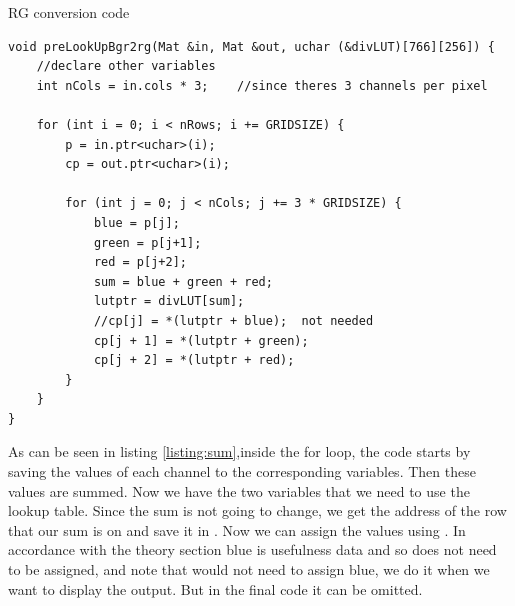 \begin{listing}[H]
	\caption{RG conversion code}
	\label{listing:sum}
	\begin{verbatim}
void preLookUpBgr2rg(Mat &in, Mat &out, uchar (&divLUT)[766][256]) {
	//declare other variables
	int nCols = in.cols * 3;	//since theres 3 channels per pixel
	
	for (int i = 0; i < nRows; i += GRIDSIZE) {
		p = in.ptr<uchar>(i);
		cp = out.ptr<uchar>(i);
		
		for (int j = 0; j < nCols; j += 3 * GRIDSIZE) {
			blue = p[j];
			green = p[j+1];
			red = p[j+2];
			sum = blue + green + red;
			lutptr = divLUT[sum];
			//cp[j] = *(lutptr + blue);  not needed
			cp[j + 1] = *(lutptr + green);
			cp[j + 2] = *(lutptr + red);
		}
	}
}
	\end{verbatim}
\end{listing}
As can be seen in listing \ref{listing:sum},inside the for loop, the code starts by saving the values of each channel to the corresponding variables. Then these values are summed. Now we have the two variables that we need to use the lookup table. Since the sum is not going to change, we get the address of the row that our sum is on and save it in . Now we can assign the values using . In accordance with the theory section blue is usefulness data and so does not need to be assigned, and note that would not need to assign blue, we do it when we want to display the output. But in the final code it can be omitted.
